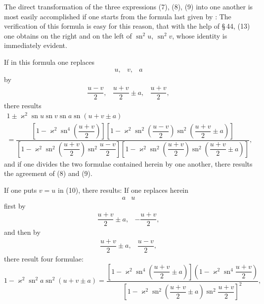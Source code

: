 
The direct transformation of the three expressions (7), (8), (9) into one
 another is most easily accomplished if one starts from the formula last
given by :
The verification of this formula is easy for this reason, that
with the help of \S\,44, (13) one obtains on the right and on the left 
of $\operatorname{sn}^2u$, $\operatorname{sn}^2v$, whose identity is immediately evident.

If in this formula one replaces
\[
\begin{array}{ccc}
u, & v, & a
\end{array}
\]
by
\[
\begin{array}{ccc}
\dfrac{u-v}{2}, & \dfrac{u+v}{2}\pm a, & \dfrac{u+v}{2},
\end{array}
\]
there results
\[
\begin{gathered}
1 \pm \varkappa^2 \operatorname{sn} u\operatorname{sn} v\operatorname{sn} a\operatorname{sn}(u+v\pm a) \\
= \dfrac{\left[1-\varkappa^2\operatorname{sn}^4\left(\dfrac{u+v}{2}\right)\right]\left[1-\varkappa^2\operatorname{sn}^2\left(\dfrac{u-v}{2}\right)\operatorname{sn}^2\left(\dfrac{u+v}{2}\pm a\right)\right]}{\left[1-\varkappa^2\operatorname{sn}^2\left(\dfrac{u+v}{2}\right)\operatorname{sn}^2\dfrac{u-v}{2}\right]\left[1-\varkappa^2\operatorname{sn}^2\left(\dfrac{u+v}{2}\right)\operatorname{sn}^2\left(\dfrac{u+v}{2}\pm a\right)\right]},
\end{gathered}
\]
and if one divides the two formulae contained herein by one
 another, there results the agreement of (8)
and (9).

If one puts $v=u$ in (10), there results:
If one replaces herein
\[
\begin{array}{cc}
a & u
\end{array}
\]
first by
\[
\begin{array}{cc}
\dfrac{u+v}{2}\pm a, & -\dfrac{u+v}{2},
\end{array}
\]
and then by
\[
\begin{array}{cc}
\dfrac{u+v}{2}\pm a, & \dfrac{u-v}{2},
\end{array}
\]
there result four formulae:
\[
1 - \varkappa^2\operatorname{sn}^2a\operatorname{sn}^2(u+v\pm a) = \dfrac{\left[1-\varkappa^2\operatorname{sn}^4\left(\dfrac{u+v}{2}\pm a\right)\right]\left(1-\varkappa^2\operatorname{sn}^4\dfrac{u+v}{2}\right)}{\left[1-\varkappa^2\operatorname{sn}^2\left(\dfrac{u+v}{2}\pm a\right)\operatorname{sn}^2\dfrac{u+v}{2}\right]^2},
\]

